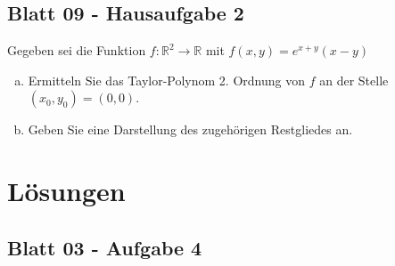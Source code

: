 \documentclass{scrreprt}
\begin{document}
\section{Blatt 09 - Hausaufgabe 2}

Gegeben sei die Funktion
$f \colon \mathbb{R}^2 \to \mathbb{R}$ mit
$f(x, y) = e^{x + y}(x - y)$
\begin{enumerate}[a)]
\item Ermitteln Sie das Taylor-Polynom 2. Ordnung von $f$ an der Stelle
  $(x_0, y_0) = (0, 0)$.
\item Geben Sie eine Darstellung des zugehörigen Restgliedes an.
\end{enumerate}

\chapter{Lösungen}

\section{Blatt 03 - Aufgabe 4}
\end{document}
